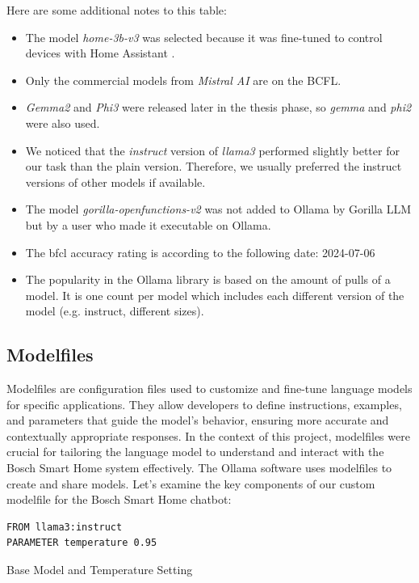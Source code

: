 Here are some additional notes to this table:
\begin{itemize}
    \item The model \textit{home-3b-v3} was selected because it was fine-tuned to control devices with Home Assistant \cite{acon96_home_llm}.
    \item Only the commercial models from \textit{Mistral AI} are on the BCFL.
    \item \textit{Gemma2} and \textit{Phi3} were released later in the thesis phase, so \textit{gemma} and \textit{phi2} were also used.
    \item We noticed that the \textit{instruct} version of \textit{llama3} performed slightly better for our task than the plain version. Therefore, we usually preferred the instruct versions of other models if available.
    \item The model \textit{gorilla-openfunctions-v2} was not added to Ollama by Gorilla LLM but by a user who made it executable on Ollama.
    \item The \gls{bfcl} accuracy rating is according to the following date: 2024-07-06
    \item The popularity in the Ollama library is based on the amount of pulls of a model. It is one count per model which includes each different version of the model (e.g. instruct, different sizes).
\end{itemize}

\subsection{Modelfiles}
Modelfiles are configuration files used to customize and fine-tune language models for specific applications. They allow developers to define instructions, examples, and parameters that guide the model's behavior, ensuring more accurate and contextually appropriate responses. In the context of this project, modelfiles were crucial for tailoring the language model to understand and interact with the Bosch Smart Home system effectively.
The Ollama software uses modelfiles to create and share models. Let's examine the key components of our custom modelfile for the Bosch Smart Home chatbot:

\begin{Listing}
\begin{lstlisting}[language=bash]
FROM llama3:instruct
PARAMETER temperature 0.95
\end{lstlisting}
\caption{Base Model and Temperature Setting}
\label{lst:base_model}
\end{Listing}

